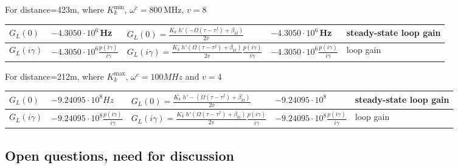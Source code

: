 \documentclass{article}
\begin{document}
For distance=423m, where $K_k^\textrm{min}$, $\omega^c=800$\,MHz, $v=8$  
\begin{flushleft}
\begin{tabular}{ |p{1.5cm}||p{3.9cm}|p{5.9cm}|p{3.0cm}|p{3cm}|  }
 \hline
$G_L(0)$   & $-4.3050 \cdot10^6$\,Hz    & $G_L(0)=\frac{K_k\;h'(-\Omega(\tau-\tau^f)+\beta_{kl})}{2v}$ &  $-4.3050 \cdot10^6$\,Hz & steady-state loop gain\\
 \hline
$G_L(i\gamma)$   & $-4.3050 \cdot10^6 \frac{p(i\gamma)}{i\gamma}$    & $G_L(i\gamma)=\frac{K_k\;h'(\Omega(\tau-\tau^f)+\beta_{kl})}{2v}\frac{p(i\gamma)}{i\gamma}$ &  $-4.3050 \cdot10^6 \frac{p(i\gamma)}{i\gamma}$ & loop gain\\
 \hline
\end{tabular}

\end{flushleft}




For distance=212m, where $K_k^\textrm{max}$, $\omega^c=100MHz$ and $v=4$ 
\begin{flushleft}
\begin{tabular}{ |p{1.5cm}||p{3.9cm}|p{5.9cm}|p{3.0cm}|p{3cm}|  }
 \hline
$G_L(0)$   & $-9.24095\cdot10^8 Hz$    & $G_L(0)=\frac{K_k\;h'-(\Omega(\tau-\tau^f)+\beta_{kl})}{2v}$ &  $-9.24095\cdot10^8$ & steady-state loop gain\\
 \hline
$G_L(i\gamma)$   & $-9.24095\cdot10^8 \frac{p(i\gamma)}{i\gamma}$    & $G_L(i\gamma)=\frac{K_k\;h'(\Omega(\tau-\tau^f)+\beta_{kl})}{2v}\frac{p(i\gamma)}{i\gamma}$ &  $-9.24095\cdot10^8 \frac{p(i\gamma)}{i\gamma}$ & loop gain\\
 \hline
\end{tabular}

\end{flushleft}

\subsection*{Open questions, need for discussion}
\end{document}
